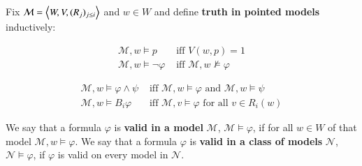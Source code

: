 \documentclass[nobib,nofonts]{tufte-handout}
\renewcommand{\phi}{\ensuremath{\varphi}}
\newcommand{\ra}{\ensuremath{\rightarrow}}
\newcommand{\Bel}{\ensuremath{B}}
\newcommand{\Poss}{\ensuremath{P}}
\newcommand{\Model}{\ensuremath{\mathcal{M}}}
\begin{document}
\begin{definition}
  Fix $\Model = \tuple{W,V,(R_j)_{j \le i}}$ and $w \in W$ and define \textbf{truth in
  pointed models} inductively:

\vspace{-1em}
\begin{minipage}{0.45\linewidth}
  \begin{align*}
    \Model, w \models p & \text{ \ iff \  } V(w,p) = 1\\
    \Model, w \models \neg \phi & \text{ \ iff \ } \Model, w \not \models \phi
  \end{align*}
\end{minipage}
\begin{minipage}{0.45\linewidth}
  \begin{align*}
    \Model, w \models \phi \wedge \psi & \text{ \ iff \ } \Model, w
    \models \phi \text{ \ and \ } \Model, w \models \psi \\
    \Model, w \models \Bel_i \phi & \text{ \ iff \ } \Model, v \models
    \phi \text{ \ for all $v \in R_i(w)$}
  \end{align*}
\end{minipage}
\medskip \medskip

 We say that a formula $\phi$ is \textbf{valid in a model} $\Model$,
  $\Model \models \phi$, if for all $w \in W$ of that model $\Model, w
  \models \phi$. We say that a formula $\phi$ is \textbf{valid in a
    class of models} $\mathcal{N}$, $\mathcal{N} \models \phi$, if
  $\phi$ is valid on every model in $\mathcal{N}$.
\end{definition}
\end{document}
